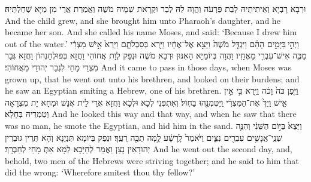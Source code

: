 {{וּרְבָא רָבְיָא וְאֵיתִיתֵיהּ לְבַת פַּרְעֹה וַהֲוָה לַהּ לְבַר וּקְרָאת שְׁמֵיהּ מֹשֶׁה וַאֲמַרַת אֲרֵי מִן מַיָּא שְׁחַלְתֵּיהּ׃}
{And the child grew, and she brought him unto Pharaoh’s daughter, and he became her son. And she called his name Moses, and said: ‘Because I drew him out of the water.’}{}
{וַיְהִ֣י \legarmeh  בַּיָּמִ֣ים הָהֵ֗ם וַיִּגְדַּ֤ל מֹשֶׁה֙ וַיֵּצֵ֣א אֶל־אֶחָ֔יו וַיַּ֖רְא בְּסִבְלֹתָ֑ם וַיַּרְא֙ אִ֣ישׁ מִצְרִ֔י מַכֶּ֥ה אִישׁ־עִבְרִ֖י מֵאֶחָֽיו׃
}
{וַהֲוָה בְּיוֹמַיָּא הָאִנּוּן וּרְבָא מֹשֶׁה וּנְפַק לְוָת אֲחוֹהִי וַחֲזָא בְּפוּלְחָנְהוֹן וַחֲזָא גְּבַר מִצְרַי מָחֵי לִגְבַר יְהוּדַי מֵאֲחוֹהִי׃}
{And it came to pass in those days, when Moses was grown up, that he went out unto his brethren, and looked on their burdens; and he saw an Egyptian smiting a Hebrew, one of his brethren.}{}
{וַיִּ֤פֶן כֹּה֙ וָכֹ֔ה וַיַּ֖רְא כִּ֣י אֵ֣ין אִ֑ישׁ וַיַּךְ֙ אֶת־הַמִּצְרִ֔י וַֽיִּטְמְנֵ֖הוּ בַּחֽוֹל׃
}
{וְאִתְפְּנִי לְכָא וּלְכָא וַחֲזָא אֲרֵי לֵית אֲנָשׁ וּמְחָא יָת מִצְרָאָה וְטַמְרֵיהּ בְּחָלָא׃}
{And he looked this way and that way, and when he saw that there was no man, he smote the Egyptian, and hid him in the sand.}{}
{וַיֵּצֵא֙ בַּיּ֣וֹם הַשֵּׁנִ֔י וְהִנֵּ֛ה שְׁנֵֽי־אֲנָשִׁ֥ים עִבְרִ֖ים נִצִּ֑ים וַיֹּ֙אמֶר֙ לָֽרָשָׁ֔ע לָ֥מָּה תַכֶּ֖ה רֵעֶֽךָ׃
}
{וּנְפַק בְּיוֹמָא תִּנְיָנָא וְהָא תְּרֵין גּוּבְרִין יְהוּדָאִין נָצַן וַאֲמַר לְחַיָּבָא לְמָא אַתְּ מָחֵי לְחַבְרָךְ׃}
{And he went out the second day, and, behold, two men of the Hebrews were striving together; and he said to him that did the wrong: ‘Wherefore smitest thou thy fellow?’}{}
}
